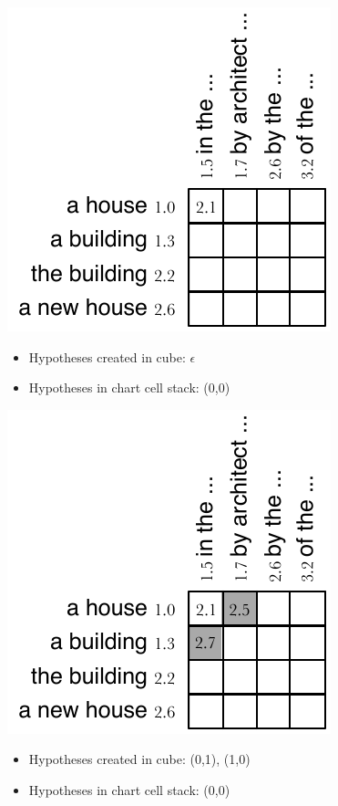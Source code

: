 \documentclass[landscape]{slides}
\begin{document}

\begin{center}\vspace{-0.5mm}
\includegraphics[scale=1.5]{cube-pruning-cube2.pdf}
\end{center}
\begin{itemize}
\item Hypotheses created in cube: $\epsilon$
\item Hypotheses in chart cell stack: (0,0)
\end{itemize}


\begin{center}
\includegraphics[scale=1.5]{cube-pruning-cube3.pdf}
\end{center}
\begin{itemize}
\item Hypotheses created in cube: (0,1), (1,0)
\item Hypotheses in chart cell stack: (0,0)
\end{itemize}
\end{document}
